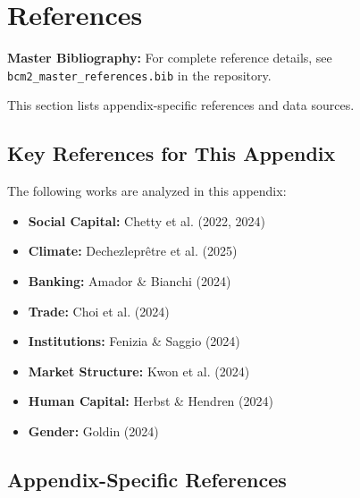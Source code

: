 \section{References}
\label{sec:J-references}

\begin{tcolorbox}[colback=blue!5!white, colframe=blue!75!black]
\textbf{Master Bibliography:} For complete reference details, see
\texttt{bcm2\_master\_references.bib} in the repository.

This section lists appendix-specific references and data sources.
\end{tcolorbox}

\vspace{0.5em}

\subsection{Key References for This Appendix}

The following works are analyzed in this appendix:

\begin{itemize}[nosep]
    \item \textbf{Social Capital:} Chetty et al. (2022, 2024)
    \item \textbf{Climate:} Dechezleprêtre et al. (2025)
    \item \textbf{Banking:} Amador \& Bianchi (2024)
    \item \textbf{Trade:} Choi et al. (2024)
    \item \textbf{Institutions:} Fenizia \& Saggio (2024)
    \item \textbf{Market Structure:} Kwon et al. (2024)
    \item \textbf{Human Capital:} Herbst \& Hendren (2024)
    \item \textbf{Gender:} Goldin (2024)
\end{itemize}

\subsection{Appendix-Specific References}

